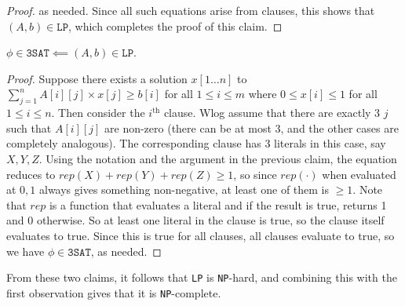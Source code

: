 \begin{soln}
\begin{proof}
        as needed. Since all such equations arise from clauses, this shows that $(A, b) \in \texttt{LP}$, which completes the proof of this claim.
    \end{proof}
    \begin{claim}
        $\phi \in \texttt{3SAT} \impliedby (A, b) \in \texttt{LP}$.
    \end{claim}
    \begin{proof}
        Suppose there exists a solution $x[1\ldots n]$ to $\sum_{j=1}^n A[i][j] \times x[j] \ge b[i]$ for all $1 \le i \le m$ where $0 \le x[i] \le 1$ for all $1 \le i \le n$. Then consider the $i^\mathrm{th}$ clause. Wlog assume that there are
        exactly 3 $j$ such that $A[i][j]$ are non-zero (there can be at most 3, and the other cases are completely analogous). The corresponding clause has 3 literals in this case, say $X, Y, Z$.
        Using the notation and the argument in the previous claim, the equation reduces to $rep(X) + rep(Y) + rep(Z) \ge 1$, so since $rep(\cdot)$ when evaluated at $0, 1$ always gives
        something non-negative, at least one of them is $\ge 1$. Note that $rep$ is a function that evaluates a literal and if the result is true, returns 1 and 0 otherwise. So at least one literal
        in the clause is true, so the clause itself evaluates to true. Since this is true for all clauses, all clauses evaluate to true, so we have $\phi \in \texttt{3SAT}$, as needed.
    \end{proof}
    From these two claims, it follows that \texttt{LP} is \texttt{NP}-hard, and combining this with the first observation gives that it is \texttt{NP}-complete.
\end{soln}
